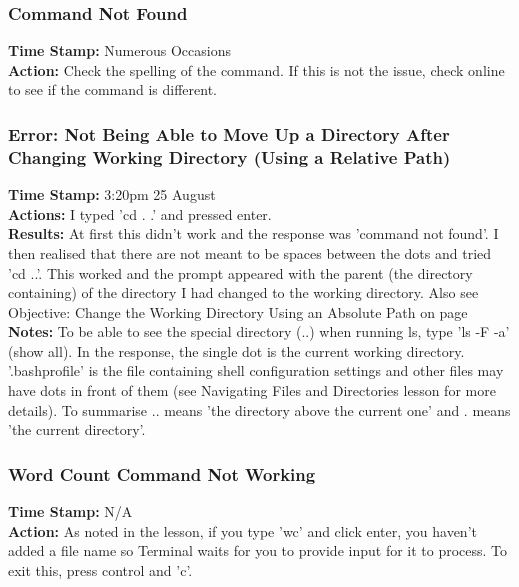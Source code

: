 \documentclass{article}
\begin{document}
\begin{FlushLeft}
\subsubsection{Command Not Found}
\textbf{Time Stamp:} Numerous Occasions\\
\textbf{Action:} Check the spelling of the command. If this is not the issue, check online to see if the command is different.\\

\subsubsection{Error: Not Being Able to Move Up a Directory After Changing Working Directory (Using a Relative Path)}
\textbf{Time Stamp:} 3:20pm 25 August\\
\textbf{Actions:} I typed 'cd . .' and pressed enter. \\
\textbf{Results:} At first this didn't work and the response was 'command not found'. I then realised that there are not meant to be spaces between the dots and tried 'cd ..'. This worked and the prompt appeared with the parent (the directory containing) of the directory I had changed to the working directory. Also see Objective: Change the Working Directory Using an Absolute Path on page \pageref{absolute}\\
\textbf{Notes:} To be able to see the special directory (..) when running ls, type 'ls -F -a' (show all). In the response, the single dot is the current working directory. '.bash\textunderscore profile' is the file containing shell configuration settings and other files may have dots in front of them (see Navigating Files and Directories lesson for more details). To summarise .. means 'the directory above the current one' and . means 'the current directory'.

\subsubsection{Word Count Command Not Working}
\textbf{Time Stamp:} N/A\\
\textbf{Action:} As noted in the lesson, if you type 'wc' and click enter, you haven't added a file name so Terminal waits for you to provide input for it to process. To exit this, press control and 'c'.\\

\end{FlushLeft}
\end{document}
